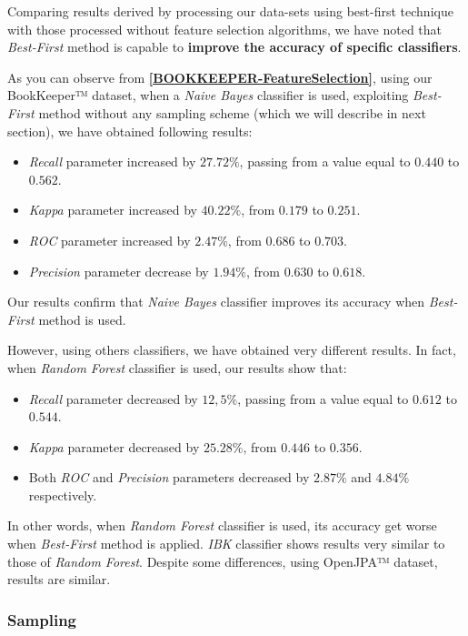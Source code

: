 \documentclass[sigconf]{acmart}
\begin{document}
Comparing results derived by processing our data-sets using best-first technique with those processed without feature selection algorithms, we have noted that \textit{Best-First} method is capable to \textbf{improve the accuracy of specific classifiers}.
 
As you can observe from \textbf{\cref{BOOKKEEPER-FeatureSelection}}, using our BookKeeper™ dataset, when a \textit{Naive Bayes} classifier is used, exploiting \textit{Best-First} method without any sampling scheme (which we will describe in next section), we have obtained following results:
\begin{itemize}
\item \textit{Recall} parameter increased by $27.72\%$, passing from a value equal to $0.440$ to $0.562$. 
\item \textit{Kappa} parameter increased by $40.22\%$, from $0.179$ to $0.251$. 
\item \textit{ROC} parameter increased by $2.47\%$, from $0.686$ to $0.703$.
\item \textit{Precision} parameter decrease by $1.94\%$, from $0.630$ to $0.618$.
\end{itemize}

Our results confirm that \textit{Naive Bayes} classifier improves its accuracy when \textit{Best-First} method is used. 

However, using others classifiers, we have obtained very different results. In fact, when \textit{Random Forest} classifier is used, our results show that: 

\begin{itemize}
\item \textit{Recall} parameter decreased by $12,5\%$, passing from a value equal to $0.612$ to $0.544$. 
\item \textit{Kappa} parameter decreased by $25.28\%$, from $0.446$ to $0.356$. 
\item Both \textit{ROC} and \textit{Precision} parameters decreased by $2.87\%$ and $4.84\%$ respectively.
\end{itemize}

In other words, when \textit{Random Forest} classifier is used, its accuracy get worse when \textit{Best-First} method is applied. \textit{IBK} classifier shows results very similar to those of \textit{Random Forest}. Despite some differences, using OpenJPA™ dataset, results are similar. 

\subsubsection{Sampling}
\hfill\\
\end{document}
